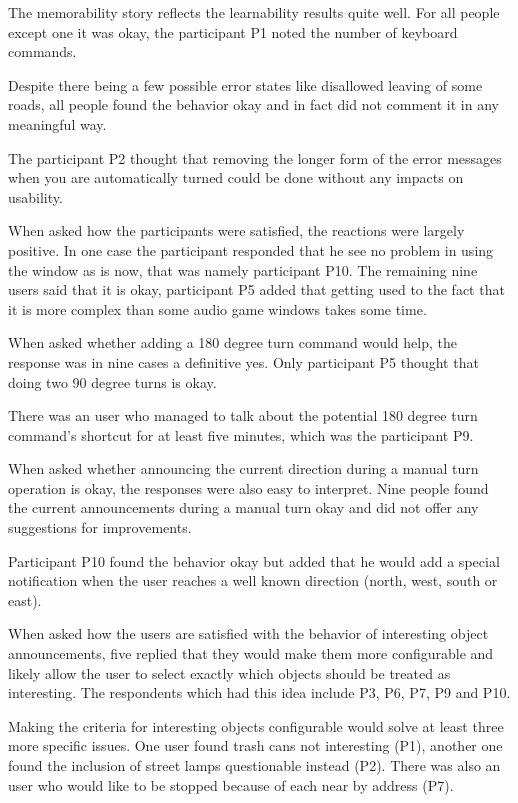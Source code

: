 \documentclass[nolof,digital]{fithesis3}
\begin{document}
The memorability story reflects the learnability results quite well. For all people except one it was okay, the participant P1 noted the number of keyboard commands.

Despite there being a few possible error states like disallowed leaving of some roads, all people found the behavior okay and in fact did not comment it in any meaningful way.

The participant P2 thought that removing the longer form of the error messages when you are automatically turned could be done without any impacts on usability.

When asked how the participants were satisfied, the reactions were largely positive. In one case the participant responded that he see no problem in using the window as is now, that was namely participant P10. The remaining nine users said that it is okay, participant P5 added that getting used to the fact that it is more complex than some audio game windows takes some time.

When asked whether adding a 180 degree turn command would help, the response was in nine cases a definitive yes. Only participant P5 thought that doing two 90 degree turns is okay.

There was an user who managed to talk about the potential 180 degree turn command's shortcut for at least five minutes, which was the participant P9.

When asked whether announcing the current direction during a manual turn operation is okay, the responses were also easy to interpret. Nine people found the current announcements during a manual turn okay and did not offer any suggestions for improvements.

Participant P10 found the behavior okay but added that he would add a special notification when the user reaches a well known direction (north, west, south or east).

When asked how the users are satisfied with the behavior of interesting object announcements, five replied that they would make them more configurable and likely allow the user to select exactly which objects should be treated as interesting. The respondents which had this idea include P3, P6, P7, P9 and P10.

Making the criteria for interesting objects configurable would solve at least three more specific issues. One user found trash cans not interesting (P1), another one found the inclusion of street lamps questionable instead (P2). There was also an user who would like to be stopped because of each near by address (P7).
\end{document}
